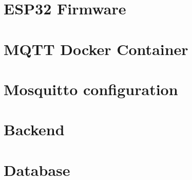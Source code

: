 \chapter{ESP32 Firmware}


\chapter{MQTT Docker Container}


\chapter{Mosquitto configuration}


\chapter{Backend}\label{sec:backend}




\chapter{Database}
